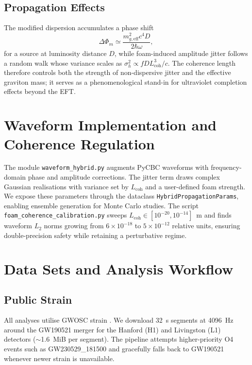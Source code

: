 \documentclass[prd,onecolumn,longbibliography,nofootinbib]{revtex4-2}
\begin{document}
\subsection{Propagation Effects}
The modified dispersion accumulates a phase shift
\begin{equation}
    \Delta \Phi_m \simeq \frac{m_{g,\mathrm{eff}}^2 c^4 D}{2 \hbar \omega},
\end{equation}
for a source at luminosity distance $D$, while foam-induced amplitude jitter follows a random walk whose variance scales as $\sigma_h^2 \propto f D L_{\mathrm{coh}}^3 / c$. The coherence length therefore controls both the strength of non-dispersive jitter and the effective graviton mass; it serves as a phenomenological stand-in for ultraviolet completion effects beyond the EFT.

\section{Waveform Implementation and Coherence Regulation}
The module \texttt{waveform\_hybrid.py} augments PyCBC waveforms with frequency-domain phase and amplitude corrections. The jitter term draws complex Gaussian realisations with variance set by $L_{\mathrm{coh}}$ and a user-defined foam strength. We expose these parameters through the dataclass \texttt{HybridPropagationParams}, enabling ensemble generation for Monte Carlo studies. The script \texttt{foam\_coherence\_calibration.py} sweeps $L_{\mathrm{coh}} \in [10^{-20},10^{-14}]$~m and finds waveform $L_2$ norms growing from $6 \times 10^{-18}$ to $5 \times 10^{-12}$ relative units, ensuring double-precision safety while retaining a perturbative regime.

\section{Data Sets and Analysis Workflow}
\subsection{Public Strain}
All analyses utilise GWOSC strain \cite{GWTC4}. We download \SI{32}{s} segments at \SI{4096}{Hz} around the GW190521 merger for the Hanford (H1) and Livingston (L1) detectors (\(\sim\)\SI{1.6}{MiB} per segment). The pipeline attempts higher-priority O4 events such as GW230529\_181500 and gracefully falls back to GW190521 whenever newer strain is unavailable.
\end{document}
